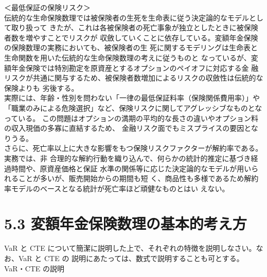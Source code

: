 \documentclass[report,gutter=10mm,fore-edge=10mm,uplatex,dvipdfmx]{jlreq}
\begin{document}
＜最低保証の保険リスク＞\\
伝統的な生命保険数理では被保険者の生死を生命表に従う決定論的なモデルとして取り扱って
きたが、これは各被保険者の死亡事象が独立としたときに被保険者数を増やすことでリスクが
収斂していくことに依存している。変額年金保険の保険数理の実務においても、被保険者の生
死に関するモデリングは生命表と生命関数を用いた伝統的な生命保険数理の考えに従うものと
なっているが、変額年金保険では特別勘定を原資産とするオプションのペイオフに対応する金
融リスクが共通に関与するため、被保険者数増加によるリスクの収斂性は伝統的な保険よりも
劣後する。\\
実際には、年齢・性別を問わない「一律の最低保証料率（保険関係費用率）」や
「職業のみによる危険選択」など、保険リスクに関してアグレッシブなものとなっている。
この問題はオプションの満期の平均的な長さの違いやオプション料の収入現価の多寡に直結するため、
金融リスク面でもミスプライスの要因となりうる。\\
さらに、死亡率以上に大きな影響をもつ保険リスクファクターが解約率である。実務では、非
合理的な解約行動を織り込んで、何らかの統計的推定に基づき経過時間や、原資産価格と保証
水準の関係等に応じた決定論的なモデルが用いられることが多いが、販売開始からの期間も短
く、商品性も多様であるため解約率モデルのベースとなる統計が死亡率ほど頑健なものとはい
えない。
\section{5.3 変額年金保険数理の基本的考え方}
VaR と CTE について簡潔に説明した上で、それぞれの特徴を説明しなさい。なお、VaR と CTE の
説明にあたっては、数式で説明することも可とする。
\answer{}
VaR・CTE の説明
\end{document}
